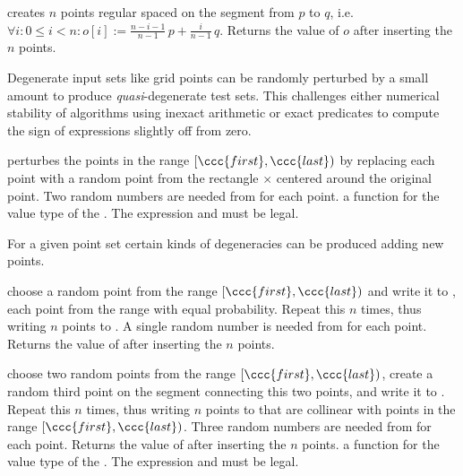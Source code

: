 { creates $n$ points regular spaced on the segment from $p$ to $q$,
    i.e.~$\forall i: 0 \le i < n: o[i] := \frac{n-i-1}{n-1}\, p +
    \frac{i}{n-1}\, q$. Returns the value of $o$ after inserting
    the $n$ points.}


Degenerate input sets like grid points can be randomly perturbed by a
small amount to produce {\em quasi}-degenerate test sets. This
challenges either numerical stability of algorithms using inexact
arithmetic or exact predicates to compute the sign of expressions
slightly off from zero. 

{ perturbes the points in the range $[\ccc{first},\ccc{last})$ by
  replacing each point with a random point from the rectangle
   $\times$  centered around the original point.
  Two random numbers are needed from  for each point.
  \ccPrecond a function  for the value type of
    the . 
    The expression  and
     must be legal. 
}


For a given point set certain kinds of degeneracies can be produced
adding new points.

{ choose a random point from the range $[\ccc{first},\ccc{last})$ and
    write it to , each point from the range with equal
    probability. Repeat this $n$ times, thus writing $n$ points to
    .
    A single random number is needed from  for each point.
    Returns the value of  after inserting the $n$ points.
}

{ choose two random points from the range $[\ccc{first},\ccc{last})$,
    create a random third point on the segment connecting this two
    points, and write it to . Repeat this $n$ times, thus
    writing $n$ points to  that are collinear with points
    in the range $[\ccc{first},\ccc{last})$.
    Three random numbers are needed from  for each point.
    Returns the value of  after inserting the $n$ points.
  \ccPrecond a function  for the value type of
    the . 
    The expression  and
     must be legal. 
}

